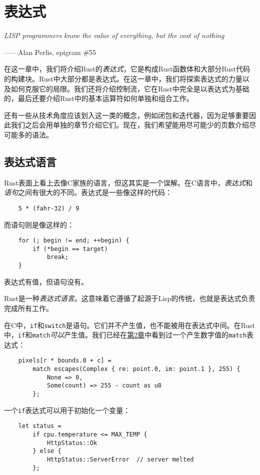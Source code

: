 \chapter{表达式}\label{ch06}

\emph{LISP programmers know the value of everything, but the cost of nothing}

\begin{flushright}
    ——Alan Perlis, epigram \#55
\end{flushright}

在这一章中，我们将介绍Rust的\emph{表达式}，它是构成Rust函数体和大部分Rust代码的构建块。Rust中大部分都是表达式。在这一章中，我们将探索表达式的力量以及如何克服它的局限。我们还将介绍控制流，它在Rust中完全是以表达式为基础的，最后还要介绍Rust中的基本运算符如何单独和组合工作。

还有一些从技术角度应该划入这一类的概念，例如闭包和迭代器，因为足够重要因此我们之后会用单独的章节介绍它们。现在，我们希望能用尽可能少的页数介绍尽可能多的语法。

\section{表达式语言}

Rust表面上看上去像C家族的语言，但这其实是一个误解。在C语言中，\emph{表达式}和\emph{语句}之间有很大的不同。表达式是一些像这样的代码：
\begin{verbatim}
    5 * (fahr-32) / 9
\end{verbatim}
而语句则是像这样的：
\begin{verbatim}
    for (; begin != end; ++begin) {
        if (*begin == target)
            break;
    }
\end{verbatim}
表达式有值，但语句没有。

Rust是一种\emph{表达式语言}。这意味着它遵循了起源于Lisp的传统，也就是表达式负责完成所有工作。

在C中，\texttt{if}和\texttt{switch}是语句。它们并不产生值，也不能被用在表达式中间。在Rust中，\texttt{if}和\texttt{match}\emph{可以}产生值。我们已经在\hyperref[ch02]{第2章}中看到过一个产生数字值的\texttt{match}表达式：
\begin{verbatim}
    pixels[r * bounds.0 + c] =
        match escapes(Complex { re: point.0, im: point.1 }, 255) {
            None => 0,
            Some(count) => 255 - count as u8
        };
\end{verbatim}

一个\texttt{if}表达式可以用于初始化一个变量：
\begin{verbatim}
    let status =
        if cpu.temperature <= MAX_TEMP {
            HttpStatus::Ok
        } else {
            HttpStatus::ServerError  // server melted
        };
\end{verbatim}

